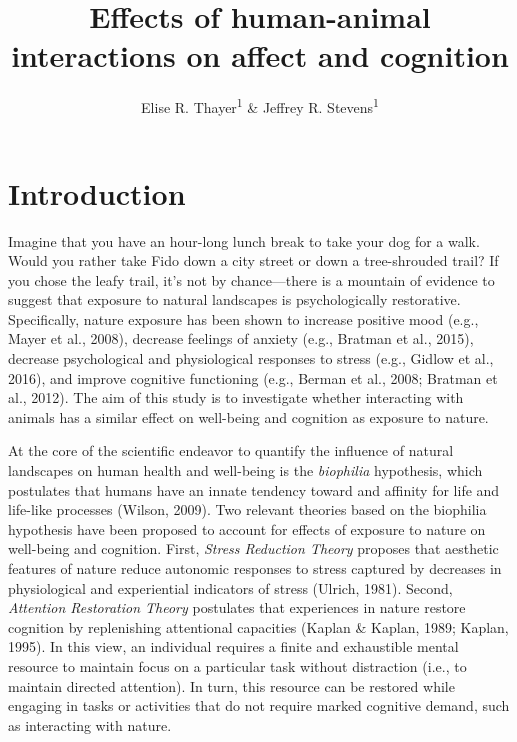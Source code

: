 \documentclass[
  english,
  pub,floatsintext]{apa6}
\title{Effects of human-animal interactions on affect and cognition}
\author{Elise R. Thayer\textsuperscript{1} \& Jeffrey R. Stevens\textsuperscript{1}}
\date{}
\affiliation{\vspace{0.5cm}\textsuperscript{1} University of Nebraska-Lincoln}
\begin{document}
\maketitle

\hypertarget{introduction}{%
\section{Introduction}\label{introduction}}

Imagine that you have an hour-long lunch break to take your dog for a walk. Would you rather take Fido down a city street or down a tree-shrouded trail? If you chose the leafy trail, it's not by chance---there is a mountain of evidence to suggest that exposure to natural landscapes is psychologically restorative. Specifically, nature exposure has been shown to increase positive mood (e.g., Mayer et al., 2008), decrease feelings of anxiety (e.g., Bratman et al., 2015), decrease psychological and physiological responses to stress (e.g., Gidlow et al., 2016), and improve cognitive functioning (e.g., Berman et al., 2008; Bratman et al., 2012). The aim of this study is to investigate whether interacting with animals has a similar effect on well-being and cognition as exposure to nature.

At the core of the scientific endeavor to quantify the influence of natural landscapes on human health and well-being is the \emph{biophilia} hypothesis, which postulates that humans have an innate tendency toward and affinity for life and life-like processes (Wilson, 2009). Two relevant theories based on the biophilia hypothesis have been proposed to account for effects of exposure to nature on well-being and cognition. First, \emph{Stress Reduction Theory} proposes that aesthetic features of nature reduce autonomic responses to stress captured by decreases in physiological and experiential indicators of stress (Ulrich, 1981). Second, \emph{Attention Restoration Theory} postulates that experiences in nature restore cognition by replenishing attentional capacities (Kaplan \& Kaplan, 1989; Kaplan, 1995). In this view, an individual requires a finite and exhaustible mental resource to maintain focus on a particular task without distraction (i.e., to maintain directed attention). In turn, this resource can be restored while engaging in tasks or activities that do not require marked cognitive demand, such as interacting with nature.
\end{document}
